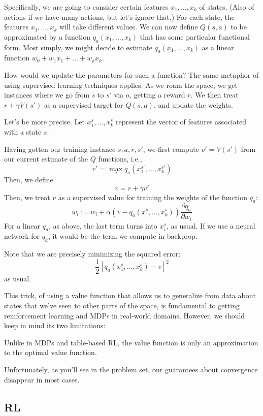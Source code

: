 Specifically, we are going to consider certain features $x_1,\ldots,x_k$ of
states.  (Also of actions if we have many actions, but let's ignore that.)
For each state, the features $x_1,\ldots,x_k$ will take different values.  
We can now define $Q(s,a)$ to be approximated by a function
$q_a(x_1,\ldots,x_k)$ that has some particular functional form.  Most
simply, we might decide to estimate $q_a(x_1,\ldots,x_k)$ as a linear
function $w_0 + w_1 x_1 + \ldots + w_k x_k$.  

How would we update the parameters for such a function?  The same metaphor
of using supervised learning techniques applies.  As we roam the space, we
get instances where we go from $s$ to $s'$ via $a$, getting a reward $r$.
We then treat $r + \gamma V(s')$ as a supervised target for $Q(s,a)$, and
update the weights.

Let's be more precise.  Let $x^s_1,\ldots,x^s_k$ represent the vector of
features associated with a state $s$.

Having gotten our training instance $s,a,r,s'$, we first compute $v' =
V(s')$ from  our current estimate of the $Q$ functions, i.e., 
\[
   v' = \max_a q_a(x^{s'}_1,\ldots,x^{s'}_k)
\]
Then, we define
\[
  v = r + \gamma v'
\]
Then, we treat $v$ as a supervised value for training the weights of the
function $q_a$:
\[
  w_i := w_i + \alpha (v - q_a(x^s_1,\ldots,x^s_k)) 
    \frac{\partial q_a}{\partial w_i}
\]
For a linear $q_a$, as above, the last term turns into $x^s_i$, as usual. If
we use a neural network for $q_a$, it would be the term we compute in
backprop. 

Note that we are precisely minimizing the squared error:
\[
  \frac{1}{2} [q_a(x_1^s,\ldots,x_k^s) - v]^2
\]
as usual.

This trick, of using a value function that allows us to generalize from
data about states that we've seen to other parts of the space, is
fundamental to getting reinforcement learning and MDPs in real-world
domains.  However, we should keep in mind its two limitations:
\bitem
\item
Unlike in MDPs and table-based RL, the value function is only an
approximation to the optimal value function.
\item
Unfortunately, as you'll see in the problem set, our guarantees about
convergence disappear in most cases.
\eitem

\subsection{RL}
%

